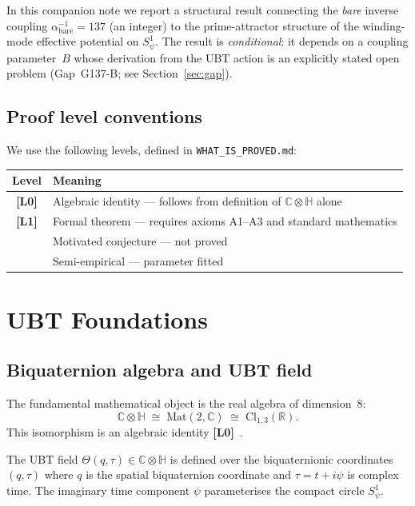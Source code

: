 \documentclass[12pt,a4paper]{article}
\theoremstyle{definition}
\theoremstyle{remark}
\newcommand{\Lzero}{\textbf{[L0]}}
\newcommand{\Lone}{\textbf{[L1]}}
\newcommand{\CC}{\mathbb{C}}
\newcommand{\HH}{\mathbb{H}}
\newcommand{\RR}{\mathbb{R}}
\begin{document}
In this companion note we report a structural result connecting the
\emph{bare} inverse coupling $\alpha^{-1}_{\mathrm{bare}} = 137$ (an integer)
to the prime-attractor structure of the winding-mode effective potential on
$S^1_\psi$.  The result is \emph{conditional}: it depends on a coupling
parameter~$B$ whose derivation from the UBT action is an explicitly stated
open problem (Gap~G137-B; see Section~\ref{sec:gap}).

\subsection{Proof level conventions}

We use the following levels, defined in \texttt{WHAT\_IS\_PROVED.md}:

\begin{center}
\begin{tabular}{cl}
\toprule
\textbf{Level} & \textbf{Meaning} \\
\midrule
\Lzero & Algebraic identity — follows from definition of $\CC\otimes\HH$ alone \\
\Lone  & Formal theorem — requires axioms A1–A3 and standard mathematics \\
[MC]   & Motivated conjecture — not proved \\
[SE]   & Semi-empirical — parameter fitted \\
\bottomrule
\end{tabular}
\end{center}

\section{UBT Foundations}
\label{sec:foundations}

\subsection{Biquaternion algebra and UBT field}

The fundamental mathematical object is the real algebra of dimension~8:
\[
  \CC\otimes\HH \;\cong\; \mathrm{Mat}(2,\CC) \;\cong\; \mathrm{Cl}_{1,3}(\RR).
\]
This isomorphism is an algebraic identity \Lzero~\cite{jaros2026_gr}.

The UBT field $\Theta(q,\tau) \in \CC\otimes\HH$ is defined over the
biquaternionic coordinates $(q,\tau)$ where $q$ is the spatial biquaternion
coordinate and $\tau = t + i\psi$ is complex time.  The imaginary time
component $\psi$ parameterises the compact circle $S^1_\psi$.
\end{document}

